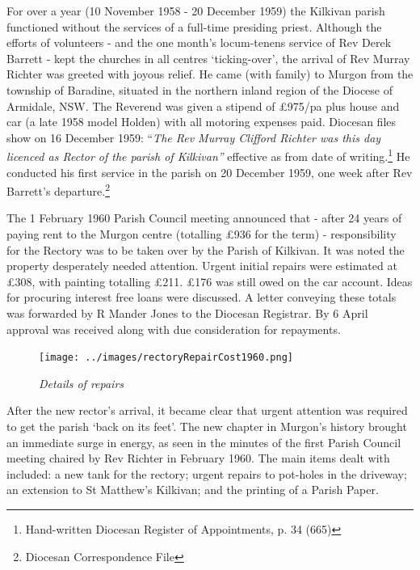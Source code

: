 For over a year (10 November 1958 - 20 December 1959) the Kilkivan parish functioned without the services of a full-time presiding priest. Although the efforts of volunteers - and the one month's locum-tenens service of Rev Derek Barrett - kept the churches in all centres `ticking-over', the arrival of Rev Murray Richter was greeted with joyous relief. He came (with family) to Murgon from the township of Baradine, situated in the northern inland region of the Diocese of Armidale, NSW. The Reverend was given a stipend of \pounds975/pa plus house and car (a late 1958 model Holden) with all motoring expenses paid. Diocesan files show on 16 December 1959: ``\emph{The Rev Murray Clifford Richter was this day licenced as Rector of the parish of Kilkivan''} effective as from date of writing.\footnote{Hand-written Diocesan Register of Appointments, p. 34 (665)} He conducted his first service in the parish on 20 December 1959, one week after Rev Barrett's departure.\footnote{Diocesan Correspondence File}


The 1 February 1960 Parish Council meeting announced that - after 24 years of paying rent to the Murgon centre (totalling \pounds936 for the term) - responsibility for the Rectory was to be taken over by the Parish of Kilkivan. It was noted the property desperately needed attention. Urgent initial repairs were estimated at \pounds308, with painting totalling \pounds211. \pounds176 was still owed on the car account. Ideas for procuring interest free loans were discussed. A letter conveying these totals was forwarded by R Mander Jones to the Diocesan Registrar. By 6 April approval was received along with due consideration for repayments.









\begin{figure}[!htb]
\begin{center}
\texttt{[image: ../images/rectoryRepairCost1960.png]}
\caption{\itshape Details of repairs}
\end{center}
\end{figure}




After the new rector's arrival, it became clear that urgent attention was required to get the parish `back on its feet'. The new chapter in Murgon's history brought an immediate surge in energy, as seen in the minutes of the first Parish Council meeting chaired by Rev Richter in February 1960. The main items dealt with included: a new tank for the rectory; urgent repairs to pot-holes in the driveway; an extension to St Matthew's Kilkivan; and the printing of a Parish Paper.



